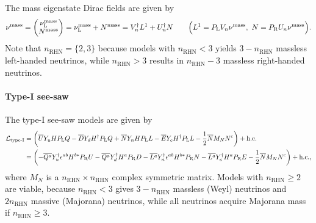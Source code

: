 \documentclass[CheatSheet]{subfiles}
\newcommand\MN[1][]{M_{N#1}}
\newcommand{\nRHN}{n_{\text{RHN}}}
\begin{document}
The mass eigenstate Dirac fields are given by
\begin{equation}
 \nu^{\text{mass}} = \begin{pmatrix}\nu_{\mathrm{L}}^{\text{mass}}\\N^{\text{mass}}\end{pmatrix} = 
\nu_{\mathrm{L}}^{\text{mass}}+N^{\text{mass}}=
V_n^\dagger L^1 + U_n^\dagger N
\qquad
 \Bigl(L^1 = P_{\mathrm{L}} V_n \nu^{\text{mass}},~
 N = P_{\mathrm{R}} U_n \nu^{\text{mass}}\Bigr).
\end{equation}
Note that $\nRHN=\{2,3\}$ because models with $\nRHN<3$ yields $3-\nRHN$ massless left-handed neutrinos, while $\nRHN>3$ results in $\nRHN-3$ massless right-handed neutrinos.

\paragraph{Type-I see-saw}
The type-I see-saw models are given by 
\begin{align}
   \mathcal L_{\text{type-I}}&=
\left(  \overline{U}\Yu H \PL Q
- \overline{D}\Yd H^\dagger \PL Q
+ \overline{N}\Yn H \PL L
- \overline{E}\Ye H^\dagger \PL L
- \frac{1}{2}\overline{N}\MN N^\cc
\right)+ \text{h.c.}
\\&=
\left(- \overline{Q^a}\Yu^\dagger \epsilon^{ab}H^{b*} \PR U
- \overline{Q^a}\Yd^\dagger H^{a} \PR D
- \overline{L^a}\Yn^\dagger \epsilon^{ab}H^{b*} \PR N
- \overline{L^a}\Ye^\dagger H^{a} \PR E
- \frac{1}{2}\overline{N}\MN N^\cc\right) + \text{h.c.},
\label{eq:type-1-lagrangian}
\end{align}
where $M_N$ is a $\nRHN\times\nRHN$ complex symmetric matrix.
Models with $\nRHN\ge2$ are viable, because $\nRHN<3$ gives $3-\nRHN$ massless (Weyl) neutrinos and $2\nRHN$ massive (Majorana) neutrinos, while all neutrinos acquire Majorana mass  if $\nRHN\ge 3$.
\end{document}
